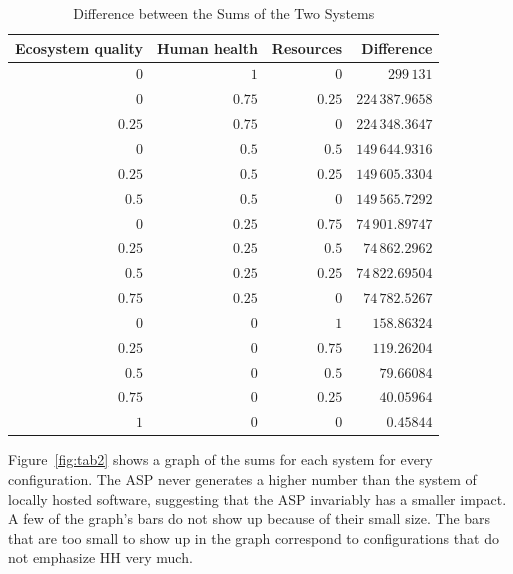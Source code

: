 \documentclass[final,journal,10pt,letterpaper,oneside,twocolumn,compsoc]%
{IEEEtran}
\begin{document}
\begin{table}[htbp]
  \caption{Difference between the Sums of the Two Systems}
  \label{tab:15}
  \centering
    \begin{tabular}{| r | r | r | r |}
      \hline
      Ecosystem quality & Human health & Resources & Difference \\
      \hline
      $0$               & $1$          & $0$       & $299\,131$ \\
      $0$               & $0.75$       & $0.25$    & $224\,387.9658$ \\
      $0.25$            & $0.75$       & $0$       & $224\,348.3647$ \\
      $0$               & $0.5$        & $0.5$     & $149\,644.9316$ \\
      $0.25$            & $0.5$        & $0.25$    & $149\,605.3304$ \\
      $0.5$             & $0.5$        & $0$       & $149\,565.7292$ \\
      $0$               & $0.25$       & $0.75$    & $74\,901.89747$ \\
      $0.25$            & $0.25$       & $0.5$     & $74\,862.2962$ \\
      $0.5$             & $0.25$       & $0.25$    & $74\,822.69504$ \\
      $0.75$            & $0.25$       & $0$       & $74\,782.5267$ \\
      $0$               & $0$          & $1$       & $158.86324$ \\
      $0.25$            & $0$          & $0.75$    & $119.26204$ \\
      $0.5$             & $0$          & $0.5$     & $79.66084$ \\
      $0.75$            & $0$          & $0.25$    & $40.05964$ \\
      $1$               & $0$          & $0$       & $0.45844$ \\
      \hline
    \end{tabular}
\end{table}

Figure~\ref{fig:tab2} shows a graph of the sums for each system for every
configuration. The ASP never generates a higher number than the system of
locally hosted software, suggesting that the ASP
invariably has a smaller impact. A few of the graph's bars do not show up
because of their small size. The bars that are too small to show up in the graph
correspond to configurations that do not emphasize HH very much.
\end{document}
